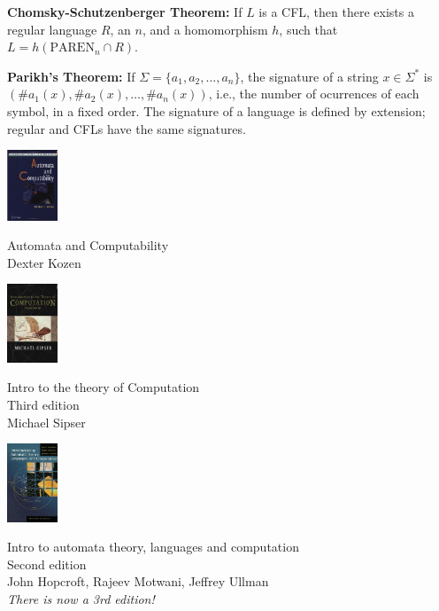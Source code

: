 \begin{frame}

{\bf Chomsky-Schutzenberger Theorem:} If $L$ is a CFL, then there
exists a regular language $R$, an $n$, and a homomorphism $h$, such
that $L=h(\text{PAREN}_n\cap R)$. 

{\bf Parikh's Theorem:} If $\Sigma=\{a_1,a_2,\ldots,a_n\}$, the
signature of a string $x\in\Sigma^*$ is $(\texttt{\#}a_1(x),
\texttt{\#}a_2(x),\ldots,\texttt{\#}a_n(x))$, i.e., the number of
ocurrences of each symbol, in a fixed order.  The signature of a
language is defined by extension; regular and CFLs have the same
signatures.
\end{frame}

\begin{frame}
\begin{minipage}{1.5cm}
\includegraphics[width=1.5cm]{figures/kozen.jpg}
\end{minipage}
\begin{minipage}{6cm}
Automata and Computability \\
Dexter Kozen
\end{minipage}

\begin{minipage}{1.5cm}
\includegraphics[width=1.5cm]{figures/sipser.jpg}
\end{minipage}
\begin{minipage}{6cm}
Intro to the theory of Computation \\
Third edition \\
Michael Sipser
\end{minipage}

\begin{minipage}{1.5cm}
\includegraphics[width=1.5cm]{figures/hopcroft.jpg}
\end{minipage}
\begin{minipage}{9cm}
Intro to automata theory, languages and computation \\
Second edition \\
John Hopcroft, Rajeev Motwani, Jeffrey Ullman \\
{\em There is now a 3rd edition!}
\end{minipage}
\end{frame}

